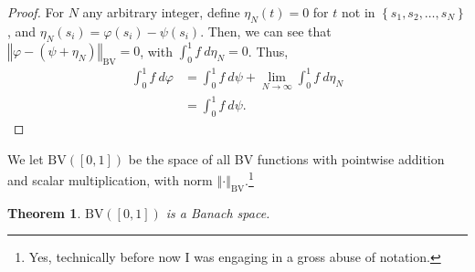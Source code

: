 \documentclass[12pt]{extarticle}
\newcommand{\norm}[1]{\left\Vert #1\right\Vert}
\newcommand{\set}[1]{\left\{#1\right\}}
\theoremstyle{plain}
\newtheorem*{theorem}{Theorem}
\theoremstyle{definition}
\theoremstyle{note}
\begin{document}
\begin{proof}
  For $N$ any arbitrary integer, define $\eta_{N}(t) = 0$ for $t$ not in $\set{s_1,s_2,\dots,s_N}$, and $\eta_{N}(s_i) = \varphi(s_i) - \psi(s_i)$. Then, we can see that $\norm{\varphi - \left(\psi + \eta_N\right)}_{\text{BV}} = 0$, with $\int_{0}^{1}f\:d\eta_N = 0$. Thus,
  \begin{align*}
    \int_{0}^{1}f\:d\varphi &= \int_{0}^{1}f\:d\psi + \lim_{N\rightarrow\infty}\int_{0}^{1}f\:d\eta_N\\
                            &= \int_{0}^{1} f\:d\psi.
  \end{align*}
\end{proof}
We let $\text{BV}\left([0,1]\right)$ be the space of all BV functions with pointwise addition and scalar multiplication, with norm $\norm{\cdot}_{\text{BV}}$.\footnote{Yes, technically before now I was engaging in a gross abuse of notation.}
\begin{theorem}
  $\text{BV}\left([0,1]\right)$ is a Banach space.
\end{theorem}
\end{document}
